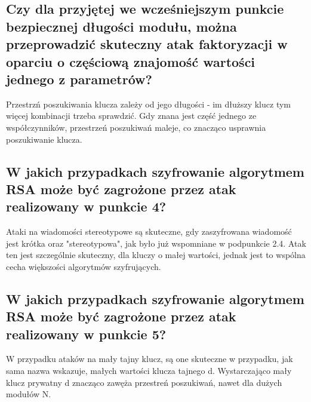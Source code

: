 \documentclass{article}
\begin{document}
\subsection{Czy dla przyjętej we wcześniejszym punkcie bezpiecznej długości modułu, można przeprowadzić skuteczny atak faktoryzacji w oparciu o częściową znajomość wartości jednego z parametrów?}
Przestrzń poszukiwania klucza zależy od jego długości - im dłuższy klucz tym więcej kombinacji trzeba sprawdzić. Gdy znana jest część jednego ze współczynników, przestrzeń poszukiwań
maleje, co znacząco usprawnia poszukiwanie klucza.
\subsection{W jakich przypadkach szyfrowanie algorytmem RSA może być zagrożone przez atak realizowany w punkcie 4?}
Ataki na wiadomości stereotypowe są skuteczne, gdy zaszyfrowana wiadomość jest krótka oraz "stereotypowa", jak było już wspomniane w podpunkcie 2.4. Atak ten jest szczególnie skuteczny, dla kluczy o małej wartości, jednak
jest to wspólna cecha większości algorytmów szyfrujących.
\subsection{W jakich przypadkach szyfrowanie algorytmem RSA może być zagrożone przez atak realizowany w punkcie 5?}
W przypadku ataków na mały tajny klucz, są one skuteczne w przypadku, jak sama nazwa wskazuje, małych wartości klucza tajnego d. Wystarczająco mały klucz prywatny d znacząco zawęża
przestreń poszukiwań, nawet dla dużych modułów N.
\end{document}
